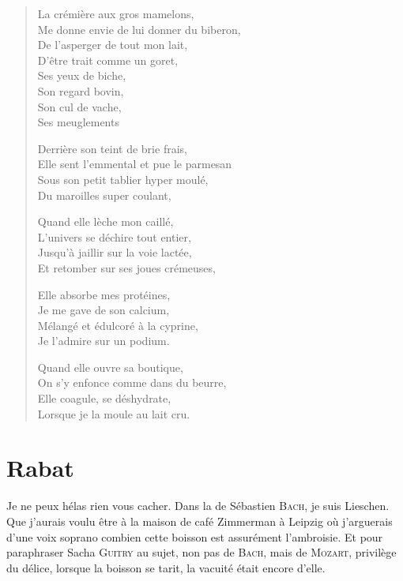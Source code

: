 \begin{verse}
La crémière aux gros mamelons,\\
Me donne envie de lui donner du biberon, \\
De l’asperger de tout mon lait, \\
D’être trait comme un goret,\\

Ses yeux de biche,\\
Son regard bovin, \\
Son cul de vache, \\
Ses meuglements 

Derrière son teint de brie frais, \\
Elle sent l’emmental et pue le parmesan \\
Sous son petit tablier hyper moulé, \\
Du maroilles super coulant, 

Quand elle lèche mon  caillé, \\
L’univers se déchire tout entier, \\
Jusqu’à jaillir sur la voie lactée, \\
Et retomber sur ses joues crémeuses, 

Elle absorbe mes protéines, \\
Je me gave de son calcium,\\
Mélangé et édulcoré à la cyprine, \\
Je l’admire sur un podium. 

Quand elle ouvre sa boutique,\\
On s’y enfonce comme dans du beurre, \\
Elle coagule, se déshydrate, \\
Lorsque je la moule au lait cru.
\end{verse}

\section*{Rabat}
\begin{prose}
Je ne peux hélas rien vous cacher. Dans la  de Sébastien \textsc{Bach}, je suis Lieschen. Que j’aurais voulu être à la maison de café Zimmerman à Leipzig où j’arguerais d’une voix soprano combien  cette boisson est assurément l’ambroisie. Et pour paraphraser Sacha \textsc{Guitry} au sujet, non pas de \textsc{Bach}, mais de \textsc{Mozart}, privilège du délice, lorsque la boisson se tarit, la vacuité était encore d’elle.
\end{prose}

